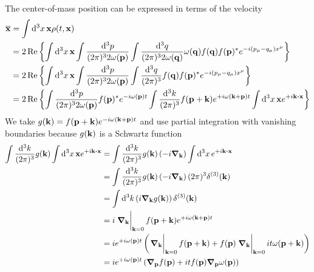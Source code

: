 The center-of-mass position can be expressed in terms of the velocity
\begin{equation}
	\begin{split}
		\overline{\vb{x}}
		&=
		\int\dd[3]{x}
		\vb{x}
		\rho(t,\vb{x})
		\\
		&=
		2\Re\left\{
			\int\dd[3]{x}
			\vb{x}
			\int\frac{\dd[3]{p}}{(2\pi)^32\omega(\vb{p})}
			\int\frac{\dd[3]{q}}{(2\pi)^32\omega(\vb{q})}
			\omega(\vb{q})
			f(\vb{q})
			f(\vb{p})^*
			e^{-i(p_\mu-q_\mu)x^\mu}
		\right\}
		\\
		&=
		2\Re\left\{
			\int\dd[3]{x}
			\vb{x}
			\int\frac{\dd[3]{p}}{(2\pi)^32\omega(\vb{p})}
			\int\frac{\dd[3]{q}}{(2\pi)^3}
			f(\vb{q})
			f(\vb{p})^*
			e^{-i(p_\mu-q_\mu)x^\mu}
		\right\}
		\\
		&=
		2\Re\left\{
			\int\frac{\dd[3]{p}}{(2\pi)^32\omega(\vb{p})}
			f(\vb{p})^*
			e^{-i\omega(\vb{p})t}
			\int\frac{\dd[3]{k}}{(2\pi)^3}
			f(\vb{p}+\vb{k})
			e^{+i\omega(\vb{k}+\vb{p})t}
			\int\dd[3]{x}
			\vb{x}
			e^{+i\vb{k}\vdot\vb{x}}
		\right\}
	\end{split}
\end{equation}
We take $g(\vb{k})=f(\vb{p}+\vb{k})e^{-i\omega(\vb{k}+\vb{p})t}$ and use partial integration with vanishing boundaries because $g(\vb{k})$ is a Schwartz function
\begin{equation}
	\begin{split}
		\int\frac{\dd[3]{k}}{(2\pi)^3}
		g(\vb{k})
		\int\dd[3]{x}
		\vb{x}
		e^{+i\vb{k}\vdot\vb{x}}
		&=
		\int\frac{\dd[3]{k}}{(2\pi)^3}
		g(\vb{k})
		\left(-i\grad_{\vb{k}}\right)
		\int\dd[3]{x}
		e^{+i\vb{k}\vdot\vb{x}}
		\\
		&=
		\int\frac{\dd[3]{k}}{(2\pi)^3}
		g(\vb{k})
		\left(-i\grad_{\vb{k}}\right)
		(2\pi)^3\delta^{(3)}(\vb{k})
		\\
		&=
		\int\dd[3]{k}
		\left(i\grad_{\vb{k}}g(\vb{k})\right)
		\delta^{(3)}(\vb{k})
		\\
		&=
		i\eval{\grad_{\vb{k}}}_{\vb{k}=0}
		f(\vb{p}+\vb{k})
		e^{+i\omega(\vb{k}+\vb{p})t}
		\\
		&=
		ie^{+i\omega(\vb{p})t}
		\left(
			\eval{\grad_{\vb{k}}}_{\vb{k}=0}
			f(\vb{p}+\vb{k})
			+
			f(\vb{p})
			\eval{\grad_{\vb{k}}}_{\vb{k}=0}
			it\omega(\vb{p}+\vb{k})
		\right)
		\\
		&=
		ie^{+i\omega(\vb{p})t}
		\left(
			\grad_{\vb{p}}
			f(\vb{p})
			+
			it
			f(\vb{p})
			\grad_{\vb{p}}
			\omega(\vb{p})
		\right)
	\end{split}
\end{equation}
